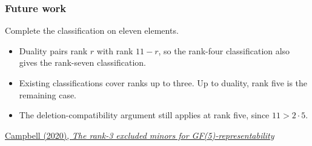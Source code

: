 \documentclass{beamer}
\begin{document}
\begin{frame}
  \frametitle{Future work}
  Complete the classification on eleven elements.
  \begin{itemize}
    \item Duality pairs rank $r$ with rank $11-r$, so the rank-four
      classification also gives the rank-seven classification.
    \item Existing classifications cover ranks up to three.
      Up to duality, rank five is the remaining case.
    \item The deletion-compatibility argument still applies at rank
      five, since $11>2\cdot5$.
  \end{itemize}
  \smallskip
  {\footnotesize
   \href{https://matroidunion.org/?p=3244}{Campbell (2020), \emph{The rank-3 excluded minors for GF(5)-representability}}}
\end{frame}
\end{document}
